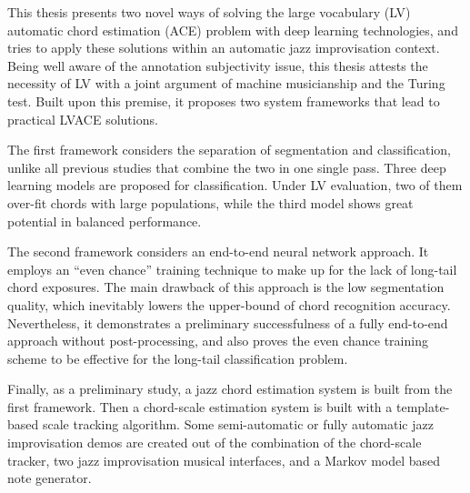 
This thesis presents two novel ways of solving the large vocabulary (LV) automatic chord estimation (ACE) problem with deep learning technologies, and tries to apply these solutions within an automatic jazz improvisation context. Being well aware of the annotation subjectivity issue, this thesis attests the necessity of LV with a joint argument of machine musicianship and the Turing test. Built upon this premise, it proposes two system frameworks that lead to practical LVACE solutions.

The first framework considers the separation of segmentation and classification, unlike all previous studies that combine the two in one single pass. Three deep learning models are proposed for classification. Under LV evaluation, two of them over-fit chords with large populations, while the third model shows great potential in balanced performance. %

The second framework considers an end-to-end neural network approach. It employs an ``even chance'' training technique to make up for the lack of long-tail chord exposures. The main drawback of this approach is the low segmentation quality, which inevitably lowers the upper-bound of chord recognition accuracy. Nevertheless, it demonstrates a preliminary successfulness of a fully end-to-end approach without post-processing, and also proves the even chance training scheme to be effective for the long-tail classification problem.

Finally, as a preliminary study, a jazz chord estimation system is built from the first framework. Then a chord-scale estimation system is built with a template-based scale tracking algorithm. Some semi-automatic or fully automatic jazz improvisation demos are created out of the combination of the chord-scale tracker, two jazz improvisation musical interfaces, and a Markov model based note generator.
